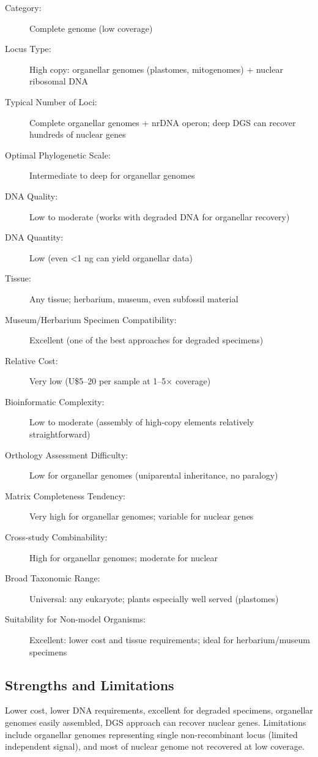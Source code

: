 \begin{description}
\item[Category:] Complete genome (low coverage)
\item[Locus Type:] High copy: organellar genomes (plastomes, mitogenomes) + nuclear ribosomal DNA
\item[Typical Number of Loci:] Complete organellar genomes + nrDNA operon; deep DGS can recover hundreds of nuclear genes
\item[Optimal Phylogenetic Scale:] Intermediate to deep for organellar genomes
\item[DNA Quality:] Low to moderate (works with degraded DNA for organellar recovery)
\item[DNA Quantity:] Low (even <1 ng can yield organellar data)
\item[Tissue:] Any tissue; herbarium, museum, even subfossil material
\item[Museum/Herbarium Specimen Compatibility:] Excellent (one of the best approaches for degraded specimens)
\item[Relative Cost:] Very low (U\$5--20 per sample at 1--5$\times$ coverage)
\item[Bioinformatic Complexity:] Low to moderate (assembly of high-copy elements relatively straightforward)
\item[Orthology Assessment Difficulty:] Low for organellar genomes (uniparental inheritance, no paralogy)
\item[Matrix Completeness Tendency:] Very high for organellar genomes; variable for nuclear genes
\item[Cross-study Combinability:] High for organellar genomes; moderate for nuclear
\item[Broad Taxonomic Range:] Universal: any eukaryote; plants especially well served (plastomes)
\item[Suitability for Non-model Organisms:] Excellent: lower cost and tissue requirements; ideal for herbarium/museum specimens
\end{description}

\subsection{Strengths and Limitations}

Lower cost, lower DNA requirements, excellent for degraded specimens, organellar genomes easily assembled, DGS approach can recover nuclear genes. Limitations include organellar genomes representing single non-recombinant locus (limited independent signal), and most of nuclear genome not recovered at low coverage.

